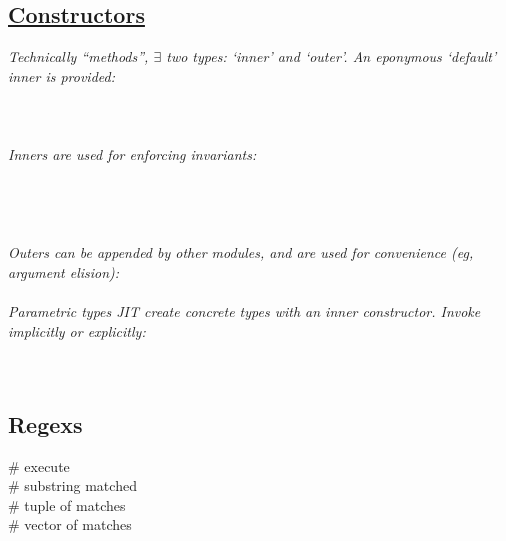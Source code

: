 \subsection*{\href{https://docs.julialang.org/en/v1/manual/constructors/}{Constructors}}
\textit{Technically ``methods'', $\exists$ two types: `inner' and `outer'. An eponymous `default' inner is provided:}\\
\\
\\
\\[2mm]
\textit{Inners are used for enforcing invariants:}\\
\\
\\
\\
\\[2mm]
\textit{Outers can be appended by other modules, and are used for convenience (eg, argument elision):}\\
\\[2mm]
\textit{Parametric types JIT create concrete types with an inner constructor. Invoke implicitly or explicitly:}\\
\\
\\



\subsection*{Regexs}
 \# execute \\
 \# substring matched \\
 \# tuple of matches \\
 \# vector of matches \\




